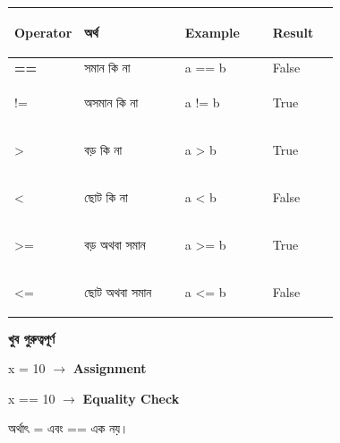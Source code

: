 \begin{tabularx}
{\linewidth}
{
|>{\bfseries\centering\arraybackslash}p{0.14\linewidth}
|>{\RaggedRight\arraybackslash}p{0.31\linewidth}
|>{\RaggedRight\arraybackslash}p{0.27\linewidth}
|Y|
}

\hline
{}

\textbf{Operator}
&
\textbf{অর্থ}
&
\textbf{Example}
&
\textbf{Result}
\\
\hline

\textenglish{\ttfamily ==}
& সমান কি না
& \textenglish{\ttfamily a == b}
& False
\\
\hline

\textenglish{\ttfamily !=}
& অসমান কি না
& \textenglish{\ttfamily a != b}
& True
\\
\hline

\textenglish{\ttfamily >}
& বড় কি না
& \textenglish{\ttfamily a > b}
& True
\\
\hline

\textenglish{\ttfamily <}
& ছোট কি না
& \textenglish{\ttfamily a < b}
& False
\\
\hline

\textenglish{\ttfamily >=}
& বড় অথবা সমান
& \textenglish{\ttfamily a >= b}
& True
\\
\hline

\textenglish{\ttfamily <=}
& ছোট অথবা সমান
& \textenglish{\ttfamily a <= b}
& False
\\
\hline

\end{tabularx}

\begin{rememberbox}

\textbf{\color{deepOrange}খুব গুরুত্বপূর্ণ}

\begin{center}

\textenglish{\ttfamily x = 10}
\(\longrightarrow\)
\textbf{Assignment}

\qquad

\textenglish{\ttfamily x == 10}
\(\longrightarrow\)
\textbf{Equality Check}

\end{center}

অর্থাৎ
\textenglish{\ttfamily =}
এবং
\textenglish{\ttfamily ==}
এক নয়।

\end{rememberbox}


